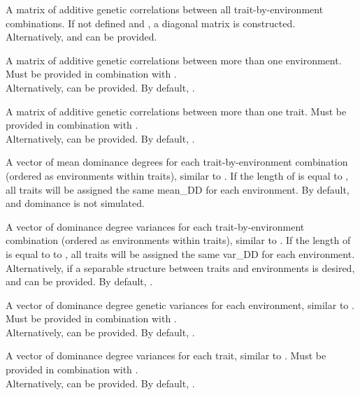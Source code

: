 \documentclass[a4paper]{book}
\begin{document}
\begin{Arguments}
\begin{ldescription}
\item[\code{cor\_A}] A matrix of additive genetic correlations between all trait-by-environment
combinations. If not defined and , a diagonal matrix is constructed. \\{}
Alternatively,  and  can be provided.

\item[\code{E\_cor\_A}] A matrix of additive genetic correlations between more than one environment.
Must be provided in combination with . \\{}
Alternatively,  can be provided. By default, .

\item[\code{T\_cor\_A}] A matrix of additive genetic correlations between more than one trait. Must be
provided in combination with . \\{}
Alternatively,  can be provided. By default, .

\item[\code{mean\_DD}] A vector of mean dominance degrees for each trait-by-environment combination
(ordered as environments within traits), similar to . If the length of
 is equal to , all traits will be assigned the same mean\_DD for
each environment. By default,  and dominance is not simulated.

\item[\code{var\_DD}] A vector of dominance degree variances for each trait-by-environment combination
(ordered as environments within traits), similar to . If the length of
 is equal to to , all traits will be assigned the same var\_DD for
each environment.\\{}
Alternatively, if a separable structure between traits and environments is desired,
 and  can be provided. By default, .

\item[\code{E\_var\_DD}] A vector of dominance degree genetic variances for each environment, similar to
. Must be provided in combination with . \\{}
Alternatively,  can be provided. By default, .

\item[\code{T\_var\_DD}] A vector of dominance degree variances for each trait, similar to .
Must be provided in combination with . \\{}
Alternatively,  can be provided. By default, .


\end{ldescription}
\end{Arguments}
\end{document}

